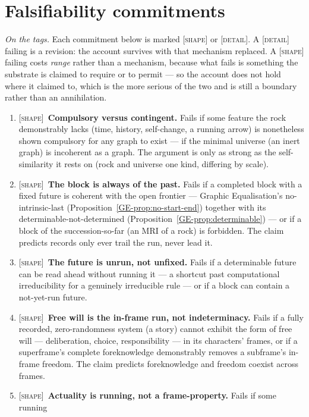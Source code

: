 \documentclass[11pt,a4paper]{article}
\theoremstyle{remark}\newtheorem{remark}[definition]{Remark}
\begin{document}
\section{Falsifiability commitments}\label{sec:falsifiability}

\noindent\emph{On the tags.} Each commitment below is marked \textsc{[shape]} or \textsc{[detail]}. A
\textsc{[detail]} failing is a revision: the account survives with that mechanism replaced. A
\textsc{[shape]} failing costs \emph{range} rather than a mechanism, because what fails is something
the substrate is claimed to require or to permit --- so the account does not hold where it claimed to,
which is the more serious of the two and is still a boundary rather than an annihilation.
\begin{enumerate}[leftmargin=*]
\item \textsc{[shape]}~\textbf{Compulsory versus contingent.} Fails if some feature the rock
demonstrably lacks (time, history, self-change, a running arrow) is nonetheless shown
compulsory for any graph to exist --- if the minimal universe (an inert graph) is
incoherent as a graph. The argument is only as strong as the self-similarity it rests
on (rock and universe one kind, differing by scale).
\item \textsc{[shape]}~\textbf{The block is always of the past.} Fails if a completed block with a fixed
future is coherent with the open frontier --- Graphic Equalisation's no-intrinsic-last
(Proposition~\ref{GE-prop:no-start-end}) together with its determinable-not-determined
(Proposition~\ref{GE-prop:determinable}) --- or if a block of the succession-so-far (an MRI of a
rock) is forbidden. The claim predicts records only ever trail the run, never lead it.
\item \textsc{[shape]}~\textbf{The future is unrun, not unfixed.} Fails if a determinable future can be
read ahead without running it --- a shortcut past computational irreducibility for a
genuinely irreducible rule --- or if a block can contain a not-yet-run future.
\item \textsc{[shape]}~\textbf{Free will is the in-frame run, not indeterminacy.} Fails if a fully
recorded, zero-randomness system (a story) cannot exhibit the form of free will ---
deliberation, choice, responsibility --- in its characters' frames, or if a
superframe's complete foreknowledge demonstrably removes a subframe's in-frame
freedom. The claim predicts foreknowledge and freedom coexist across frames.
\item \textsc{[shape]}~\textbf{Actuality is running, not a frame-property.} Fails if some running

\end{enumerate}
\end{document}
